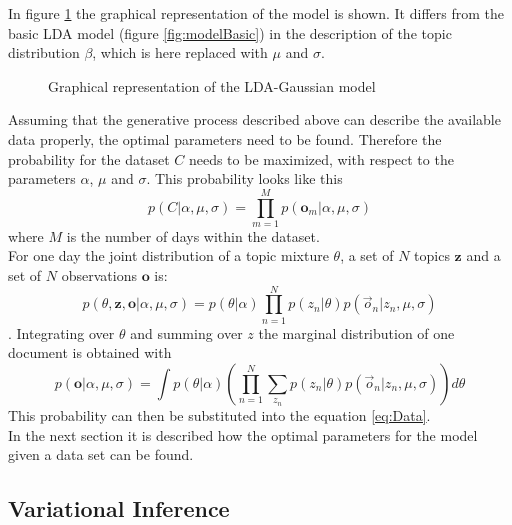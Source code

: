In figure \ref{fig:modelExt} the graphical representation of the model is shown. It differs from the basic LDA model (figure \ref{fig:modelBasic}) in the description of the topic distribution $\beta$, which is here replaced with $\mu$ and $\sigma$.

\begin{figure}[h!]
\centering
\def\svgwidth{0.8\textwidth}

\caption{Graphical representation of the LDA-Gaussian model}
\label{fig:modelExt}
\end{figure}




  
Assuming that the generative process described above can describe the available data properly, the optimal parameters need to be found. Therefore the probability for the dataset $C$ needs to be maximized, with respect to the parameters $\alpha$, $\mu$ and $\sigma$.
This probability looks like this
\begin{equation} \label{eq:Data}
p(C|\alpha,\mu,\sigma) = \prod_{m=1}^M p(\textbf{o}_m|\alpha,\mu,\sigma)
\end{equation}
where $M$ is the number of days within the dataset.\\

For one day the joint distribution of a topic mixture $\theta$, a set of $N$ topics $\textbf{z}$ and a set of $N$ observations $\textbf{o}$ is:
\begin{equation} \label{eq:Joint}
 p(\theta,\textbf{z},\textbf{o}|\alpha,\mu,\sigma) = p(\theta|\alpha) \prod_{n=1}^N p(z_n|\theta) p(\vec{o}_n|z_n,\mu,\sigma)
\end{equation}.
Integrating over $\theta$ and summing over $z$ the marginal distribution of one document is obtained with
\begin{equation} 
p(\textbf{o}|\alpha,\mu,\sigma) = \int p(\theta|\alpha)  \left( \prod_{n=1}^N \sum_{z_n} p(z_n|\theta) p(\vec{o}_n|z_n, \mu,\sigma)  \right) d\theta
\end{equation}
This probability can then be substituted into the equation \ref{eq:Data}.\\

In the next section it is described how the optimal parameters for the model given a data set can be found.


  
\subsection{Variational Inference}
 
